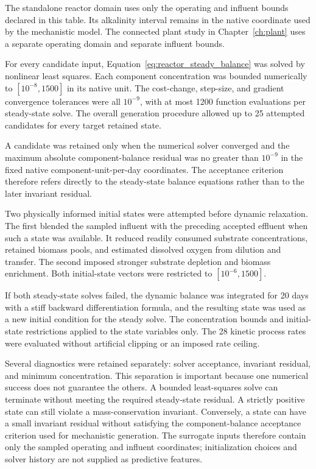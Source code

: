 The standalone reactor domain uses only the operating and influent bounds declared in this table. Its alkalinity interval remains in the native coordinate used by the mechanistic model. The connected plant study in Chapter~\ref{ch:plant} uses a separate operating domain and separate influent bounds.

For every candidate input, Equation~\eqref{eq:reactor_steady_balance} was solved by nonlinear least squares. Each component concentration was bounded numerically to $[10^{-8},1500]$ in its native unit. The cost-change, step-size, and gradient convergence tolerances were all $10^{-9}$, with at most 1200 function evaluations per steady-state solve. The overall generation procedure allowed up to 25 attempted candidates for every target retained state.

A candidate was retained only when the numerical solver converged and the maximum absolute component-balance residual was no greater than $10^{-9}$ in the fixed native component-unit-per-day coordinates. The acceptance criterion therefore refers directly to the steady-state balance equations rather than to the later invariant residual.

Two physically informed initial states were attempted before dynamic relaxation. The first blended the sampled influent with the preceding accepted effluent when such a state was available. It reduced readily consumed substrate concentrations, retained biomass pools, and estimated dissolved oxygen from dilution and transfer. The second imposed stronger substrate depletion and biomass enrichment. Both initial-state vectors were restricted to $[10^{-6},1500]$.

If both steady-state solves failed, the dynamic balance was integrated for 20 days with a stiff backward differentiation formula, and the resulting state was used as a new initial condition for the steady solve. The concentration bounds and initial-state restrictions applied to the state variables only. The 28 kinetic process rates were evaluated without artificial clipping or an imposed rate ceiling.

Several diagnostics were retained separately: solver acceptance, invariant residual, and minimum concentration. This separation is important because one numerical success does not guarantee the others. A bounded least-squares solve can terminate without meeting the required steady-state residual. A strictly positive state can still violate a mass-conservation invariant. Conversely, a state can have a small invariant residual without satisfying the component-balance acceptance criterion used for mechanistic generation. The surrogate inputs therefore contain only the sampled operating and influent coordinates; initialization choices and solver history are not supplied as predictive features.

